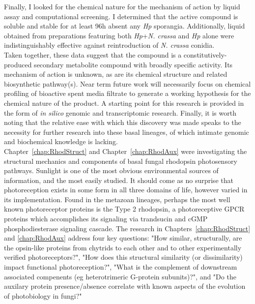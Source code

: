 \indent Finally, I looked for the chemical nature for the mechanism of action by liquid assay and computational screening. I determined that the active compound is soluble and stable for at least 96h absent any \textit{Hp} sporangia. Additionally, liquid obtained from preparations featuring both \textit{Hp}+\textit{N. crassa} and \textit{Hp} alone were indistinguishably effective against reintroduction of \textit{N. crassa} conidia.\\
\indent Taken together, these data suggest that the compound is a constitutively-produced secondary metabolite compound with broadly specific activity. Its mechanism of action is unknown, as are its chemical structure and related biosynthetic pathway(s). Near term future work will necessarily focus on chemical profiling of bioactive spent media filtrate to generate a working hypothesis for the chemical nature of the product. A starting point for this research is provided in the form of \textit{in silico} genomic and transcriptomic research. Finally, it is worth noting that the relative ease with which this discovery was made speaks to the necessity for further research into these basal lineages, of which intimate genomic and biochemical knowledge is lacking.\\
\indent Chapter~\ref{chap:RhodStruct} and Chapter~\ref{chap:RhodAux} were investigating the structural mechanics and components of basal fungal rhodopsin photosensory pathways. Sunlight is one of the most obvious environmental sources of information, and the most easily studied. It should come as no surprise that photoreception exists in some form in all three domains of life, however varied in its implementation. Found in the metazoan lineages, perhaps the most well known photoreceptor proteins is the Type 2 rhodopsin, a photoreceptive GPCR proteins which accomplishes its signaling via trandsucin and cGMP phosphodiesterase signaling cascade. The research in Chapters~\ref{chap:RhodStruct} and \ref{chap:RhodAux} address four key questions: "How similar, structurally, are the opsin-like proteins from chytrids to each other and to other experimentally verified photoreceptors?", "How does this structural similarity (or dissimilarity) impact functional photoreception?", "What is the complement of downstream associated compenents (eg heterotrimeric G-protein subunits)?", and "Do the auxilary protein presence/absence correlate with known aspects of the evolution of photobiology in fungi?" \\
